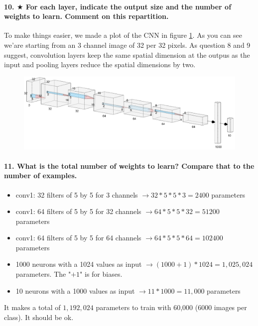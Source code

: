 \documentclass{article}
\theoremstyle{plain}%
\theoremstyle{definition}
\theoremstyle{remark}
\begin{document}
\paragraph{10. $ \bigstar $ For each layer, indicate the output size and the number of weights to learn. Comment on this repartition.}
To make things easier, we made a plot of the CNN in figure \ref{AlexNetstylelog}. As you can see we'are starting from an 3 channel image of 32 per 32 pixels. As question 8 and 9 suggest, convolution layers keep the same spatial dimension at the outpus as the input and pooling layers reduce the spatial dimensions by two. 
\begin{figure}[!htbp]
    \centering
    \includegraphics*[width=\textwidth]{figs/AlexNet_style_log.png}
    \caption{}
    \label{AlexNetstylelog}
\end{figure}


\paragraph{11. What is the total number of weights to learn? Compare that to the number of examples.}
\begin{itemize}
    \item conv1: 32 filters of 5 by 5 for 3 channels $\rightarrow 32*5*5*3 = 2400$ parameters
    \item conv1: 64 filters of 5 by 5 for 32 channels $\rightarrow 64*5*5*32 = 51200$ parameters
    \item conv1: 64 filters of 5 by 5 for 64 channels $\rightarrow 64*5*5*64 = 102400$ parameters
    \item 1000 neurons with a 1024 values as input $\rightarrow (1000 + 1)*1024=1,025,024$ parameters. The "$+1$" is for biases.
    \item 10 neurons with a 1000 values as input $\rightarrow 11*1000=11,000$ parameters
\end{itemize}
It makes a total of $ 1,192,024 $ parameters to train with 60,000 (6000 images per class). It should be ok.
\end{document}
